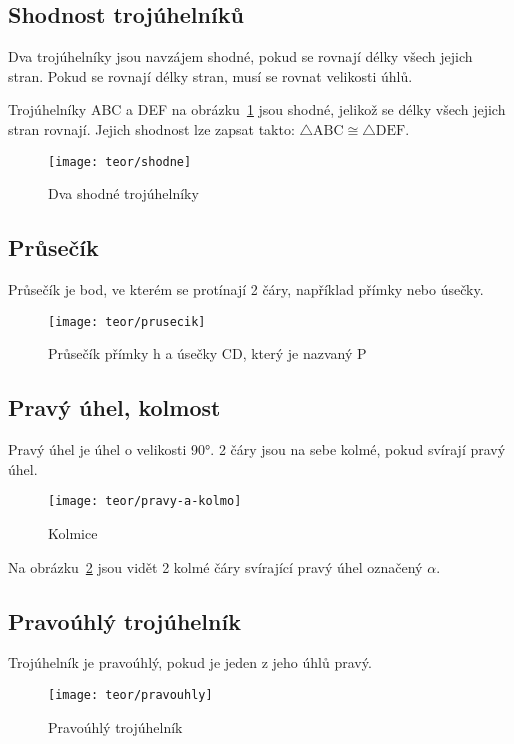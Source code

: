 \subsection{Shodnost trojúhelníků}
Dva trojúhelníky jsou navzájem shodné, pokud se rovnají délky všech jejich stran. Pokud se rovnají délky stran, musí se rovnat velikosti úhlů.

Trojúhelníky ABC a DEF na obrázku~\ref{fig:shodne} jsou shodné, jelikož se délky všech jejich stran rovnají. Jejich shodnost lze zapsat takto: $\triangle\text{ABC} \cong \triangle\text{DEF}$.

\begin{figure}[h]
	\centering
	\texttt{[image: teor/shodne]}
	\caption{Dva shodné trojúhelníky}
	\label{fig:shodne}
\end{figure}
\FloatBarrier

\subsection{Průsečík}
Průsečík je bod, ve kterém se protínají 2 čáry, například přímky nebo úsečky.

\begin{figure}[h]
    \centering
    \texttt{[image: teor/prusecik]}
    \caption{Průsečík přímky h a úsečky CD, který je nazvaný P}
\end{figure}
\FloatBarrier

\subsection{Pravý úhel, kolmost}
Pravý úhel je úhel o velikosti 90°. 2 čáry jsou na sebe kolmé, pokud svírají pravý úhel.

\begin{figure}[h]
    \centering
    \texttt{[image: teor/pravy-a-kolmo]}
    \caption{Kolmice}
    \label{fig:kolm}
\end{figure}
\FloatBarrier

Na obrázku~\ref{fig:kolm} jsou vidět 2 kolmé čáry svírající pravý úhel označený $\alpha$.

\subsection{Pravoúhlý trojúhelník}
Trojúhelník je pravoúhlý, pokud je jeden z jeho úhlů pravý.

\begin{figure}[!h]
    \centering
    \texttt{[image: teor/pravouhly]}
    \caption{Pravoúhlý trojúhelník}
    \label{fig:pravouhly_troj}
\end{figure}
\FloatBarrier

